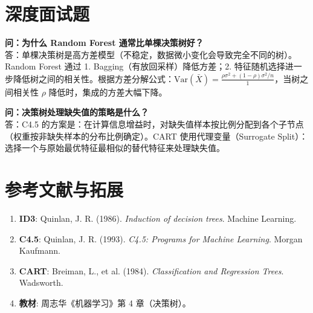\documentclass[12pt, a4paper]{article}
\begin{document}
\section{深度面试题}

\textbf{问：为什么 Random Forest 通常比单棵决策树好？}\\
答：单棵决策树是高方差模型（不稳定，数据微小变化会导致完全不同的树）。Random Forest 通过 1. Bagging（有放回采样）降低方差；2. 特征随机选择进一步降低树之间的相关性。根据方差分解公式：$\text{Var}(\bar{X}) = \frac{\rho \sigma^2 + (1-\rho)\sigma^2/n}{1}$，当树之间相关性 $\rho$ 降低时，集成的方差大幅下降。

\textbf{问：决策树处理缺失值的策略是什么？}\\
答：C4.5 的方案是：在计算信息增益时，对缺失值样本按比例分配到各个子节点（权重按非缺失样本的分布比例确定）。CART 使用代理变量（Surrogate Split）：选择一个与原始最优特征最相似的替代特征来处理缺失值。

\section{参考文献与拓展}
\begin{enumerate}
    \item \textbf{ID3}: Quinlan, J. R. (1986). \textit{Induction of decision trees}. Machine Learning.
    \item \textbf{C4.5}: Quinlan, J. R. (1993). \textit{C4.5: Programs for Machine Learning}. Morgan Kaufmann.
    \item \textbf{CART}: Breiman, L., et al. (1984). \textit{Classification and Regression Trees}. Wadsworth.
    \item \textbf{教材}: 周志华《机器学习》第 4 章（决策树）。
\end{enumerate}
\end{document}
